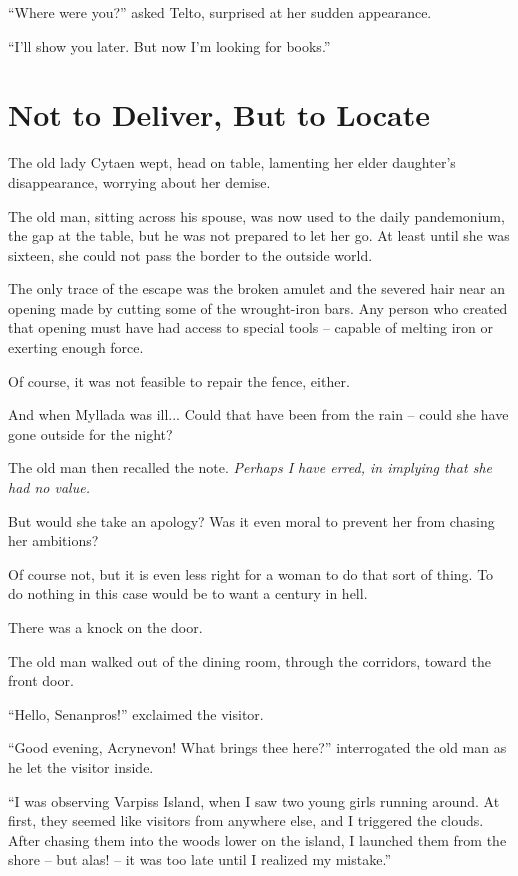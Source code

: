 ``Where were you?'' asked Telto, surprised at her sudden appearance.

``I'll show you later. But now I'm looking for books.''

\chapter{Not to Deliver, But to Locate}

The old lady Cytaen wept, head on table, lamenting her elder daughter's disappearance, worrying about her demise.

The old man, sitting across his spouse, was now used to the daily pandemonium, the gap at the table, but he was not prepared to let her go. At least until she was sixteen, she could not pass the border to the outside world.

The only trace of the escape was the broken amulet and the severed hair near an opening made by cutting some of the wrought-iron bars. Any person who created that opening must have had access to special tools -- capable of melting iron or exerting enough force.

Of course, it was not feasible to repair the fence, either.

And when Myllada was ill... Could that have been from the rain -- could she have gone outside for the night?

The old man then recalled the note. \emph{Perhaps I have erred, in implying that she had no value.}

But would she take an apology? Was it even moral to prevent her from chasing her ambitions?

Of course not, but it is even less right for a woman to do that sort of thing. To do nothing in this case would be to want a century in hell.

There was a knock on the door.

The old man walked out of the dining room, through the corridors, toward the front door.

``Hello, Senanpros!'' exclaimed the visitor.

``Good evening, Acrynevon! What brings thee here?'' interrogated the old man as he let the visitor inside.

``I was observing Varpiss Island, when I saw two young girls running around. At first, they seemed like visitors from anywhere else, and I triggered the clouds. After chasing them into the woods lower on the island, I launched them from the shore -- but alas! -- it was too late until I realized my mistake.''

